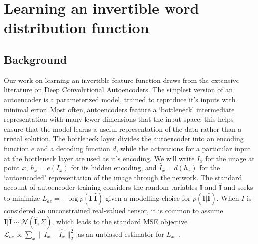 \section{Learning an invertible word distribution function} \label{sec:learning-features}

\subsection{Background}

Our work on learning an invertible feature function draws from the extensive literature on Deep Convolutional Autoencoders. The simplest version of an autoencoder is a parameterized model, trained to reproduce it's inputs with minimal error. Most often, autoencoders feature a `bottleneck' intermediate representation with many fewer dimensions that the input space; this helps ensure that the model learns a useful representation of the data rather than a trivial solution. The bottleneck layer divides the autoencoder into an encoding function $e$ and a decoding function $d$, while the activations for a particular input at the bottleneck layer are used as it's encoding. We will write $I_x$ for the image at point $x$, $h_x = e(I_x)$ for its hidden encoding, and $\hat{I}_x = d(h_x)$ for the `autoencoded' representation of the image through the network. The standard account of autoencoder training considers the random variables $\mathbf{I}$ and $\mathbf{\hat{I}}$ and seeks to minimize $L_{ae} = -\log p(\mathbf{I} | \mathbf{\hat{I}})$ given a modelling choice for $p(\mathbf{I} | \mathbf{\hat{I}})$. When $I$ is considered an unconstrained real-valued tensor, it is common to assume $\mathbf{I}|\mathbf{\hat{I}} \sim \mathcal{N}(\mathbf{\hat{I}}, \Sigma)$, which leads to the standard MSE objective $\mathcal{L}_{ae} \propto \sum_x \| I_x - \hat{I_x}\|_2^2$ as an unbiased estimator for $L_{ae}$ \citep{vincent2010stacked}.

